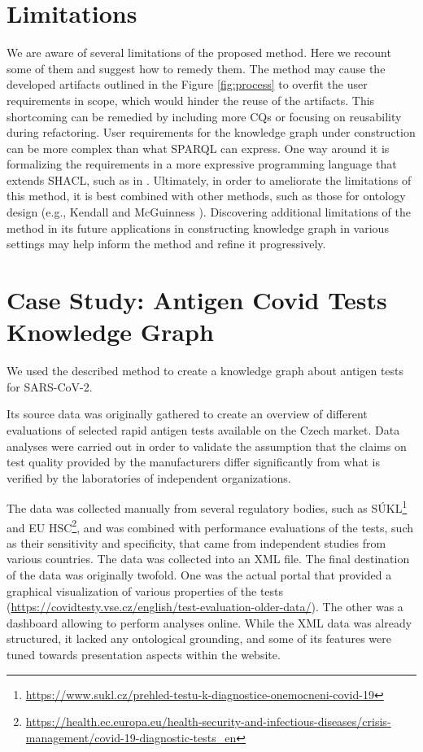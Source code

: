 \documentclass[
]{ceurart}
\begin{document}
\section{Limitations}
We are aware of several limitations of the proposed method. Here we recount some of them and suggest how to remedy them. The method may cause the developed artifacts outlined in the Figure \ref{fig:process} to overfit the user requirements in scope, which would hinder the reuse of the artifacts. This shortcoming can be remedied by including more CQs or focusing on reusability during refactoring. User requirements for the knowledge graph under construction can be more complex than what SPARQL can express. One way around it is formalizing the requirements in a more expressive programming language that extends SHACL, such as in \cite{SHACLJS2017}. Ultimately, in order to ameliorate the limitations of this method, it is best combined with other methods, such as those for ontology design (e.g., Kendall and McGuinness \cite{Kendall2019}). Discovering additional limitations of the method in its future applications in constructing knowledge graph in various settings may help inform the method and refine it progressively.

\section{Case Study: Antigen Covid Tests Knowledge Graph}

We used the described method to create a knowledge graph about antigen tests for SARS-CoV-2.

Its source data was originally gathered to create an overview of different evaluations of selected rapid antigen tests available on the Czech market.
Data analyses were carried out  \cite{Kliegr2022} in order to validate the assumption that the claims on test quality provided by the manufacturers differ significantly from what is verified by the laboratories of independent organizations.

The data was collected manually from several regulatory bodies, such as SÚKL\footnote{\url{https://www.sukl.cz/prehled-testu-k-diagnostice-onemocneni-covid-19}} and EU HSC\footnote{\url{https://health.ec.europa.eu/health-security-and-infectious-diseases/crisis-management/covid-19-diagnostic-tests_en}}, and was combined with performance evaluations of the tests, such as their sensitivity and specificity, that came from independent studies from various countries.
The data was collected into an XML file.
The final destination of the data was originally twofold.
One was the actual portal that provided a graphical visualization of various properties of the tests (\url{https://covidtesty.vse.cz/english/test-evaluation-older-data/}).
The other was a dashboard allowing to perform analyses online.
While the XML data was already structured, it lacked any ontological grounding, and some of its features were tuned towards presentation aspects within the website.
\end{document}
